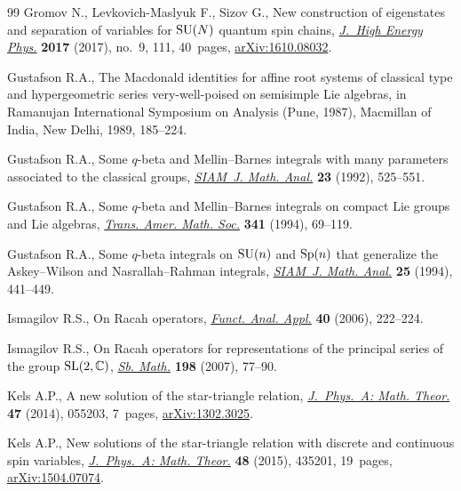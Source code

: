 \documentclass[pdftex]{sigma}
\numberwithin{equation}{section}
\begin{document}
\begin{thebibliography}{99}
Gromov N., Levkovich-Maslyuk F., Sizov G., New construction of eigenstates and
 separation of variables for {${\rm SU}(N)$} quantum spin chains,
 \href{https://doi.org/10.1007/jhep09(2017)111}{\textit{J.~High Energy Phys.}} \textbf{2017} (2017), no.~9, 111, 40~pages,
 \href{https://arxiv.org/abs/1610.08032}{arXiv:1610.08032}.

Gustafson R.A., The {M}acdonald identities for affine root systems of classical
 type and hypergeometric series very-well-poised on semisimple {L}ie algebras,
 in Ramanujan {I}nternational {S}ymposium on {A}nalysis ({P}une, 1987),
 Macmillan of India, New Delhi, 1989, 185--224.

Gustafson R.A., Some {$q$}-beta and {M}ellin--{B}arnes integrals with many
 parameters associated to the classical groups, \href{https://doi.org/10.1137/0523026}{\textit{SIAM~J. Math. Anal.}}
 \textbf{23} (1992), 525--551.

Gustafson R.A., Some {$q$}-beta and {M}ellin--{B}arnes integrals on compact
 {L}ie groups and {L}ie algebras, \href{https://doi.org/10.2307/2154615}{\textit{Trans. Amer. Math. Soc.}}
 \textbf{341} (1994), 69--119.

Gustafson R.A., Some {$q$}-beta integrals on {${\rm SU}(n)$} and {${\rm
 Sp}(n)$} that generalize the {A}skey--{W}ilson and {N}asrallah--{R}ahman
 integrals, \href{https://doi.org/10.1137/S0036141092248614}{\textit{SIAM~J. Math. Anal.}} \textbf{25} (1994), 441--449.

Ismagilov R.S., On {R}acah operators, \href{https://doi.org/10.1007/s10688-006-0034-z}{\textit{Funct. Anal. Appl.}} \textbf{40}
 (2006), 222--224.

Ismagilov R.S., On {R}acah operators for representations of the principal
 series of the group {${\rm SL}(2,{\mathbb C})$}, \href{https://doi.org/10.1070/SM2007v198n03ABEH003840}{\textit{Sb. Math.}}
 \textbf{198} (2007), 77--90.

Kels A.P., A new solution of the star-triangle relation, \href{https://doi.org/10.1088/1751-8113/47/5/055203}{\textit{J.~Phys.~A:
 Math. Theor.}} \textbf{47} (2014), 055203, 7~pages, \href{https://arxiv.org/abs/1302.3025}{arXiv:1302.3025}.

Kels A.P., New solutions of the star-triangle relation with discrete and
 continuous spin variables, \href{https://doi.org/10.1088/1751-8113/48/43/435201}{\textit{J.~Phys.~A: Math. Theor.}} \textbf{48}
 (2015), 435201, 19~pages, \href{https://arxiv.org/abs/1504.07074}{arXiv:1504.07074}.


\end{thebibliography}
\end{document}
